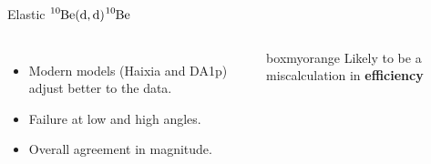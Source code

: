 \documentclass[sans,
frameno, %
mp,
usenames,dvipsnames, %
onlytextwidth, %
t,%
11pt]{beamer}
\newcommand{\iso}[2]{\ce{^{#1}#2}}
\begin{document}
\begin{frame}{Elastic $\iso{10}{Be}(\textrm{d}, \textrm{d})\iso{10}{Be}$}
\begin{figure}
\begin{minipage}[t]{0.48\linewidth}
        \end{minipage}
    \end{figure}
    \begin{columns}
        {
            \begin{itemize}
                \item Modern models (Haixia and DA1p) adjust better to the data.
                \item Failure at low and high angles.
                \item Overall agreement in magnitude.
            \end{itemize}
        }\hfill
        {

            \begin{beamercolorbox}[sep=1ex, center, rounded=true]{boxmyorange}
                Likely to be a miscalculation in \textbf{efficiency}
            \end{beamercolorbox}

        }
    \end{columns}
\end{frame}
\end{document}
